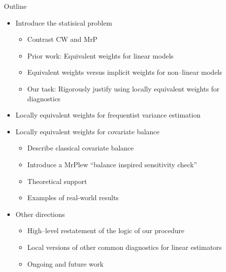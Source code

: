

\begin{frame}{Outline}
%
%
\begin{itemize}
    \item Introduce the statisical problem
    \begin{itemize}
        \item Contrast CW and MrP
        \item Prior work: Equivalent weights for linear models
        \item Equivalent weights versus implicit weights for non--linear models
        \item Our task: Rigorously justify using locally equivalent weights for diagnostics
    \end{itemize} \pause
    \item Locally equivalent weights for frequentist variance estimation \pause
    \item Locally equivalent weights for covariate balance
    \begin{itemize}
        \item Describe classical covariate balance
        \item Introduce a MrPlew ``balance inspired sensitivity check''
        \item Theoretical support
        \item Examples of real-world results
    \end{itemize} \pause
    \item Other directions
    \begin{itemize}
            \item High--level restatement of the logic of our procedure
            \item Local versions of other common diagnostics for linear estimators
            \item Ongoing and future work
    \end{itemize}
\end{itemize}
%
\end{frame}
